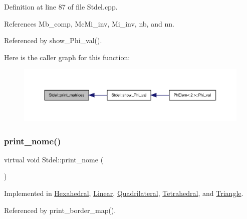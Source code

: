 Definition at line 87 of file Stdel.\+cpp.



References Mb\+\_\+comp, Mc\+Mi\+\_\+inv, Mi\+\_\+inv, nb, and nn.



Referenced by show\+\_\+\+Phi\+\_\+val().

Here is the caller graph for this function\+:
\nopagebreak
\begin{figure}[H]
\begin{center}
\leavevmode
\includegraphics[width=350pt]{classStdel_a319e6a16011b22e12028a841b7686f03_icgraph}
\end{center}
\end{figure}
\mbox{\label{classStdel_ac654f45f744ec4cfeab74ed4ded99ef5}} 
\subsubsection{\texorpdfstring{print\+\_\+nome()}{print\_nome()}}
{\footnotesize\ttfamily virtual void Stdel\+::print\+\_\+nome (\begin{DoxyParamCaption}\item[{F\+I\+LE $\ast$}]{ }\end{DoxyParamCaption})\hspace{0.3cm}{\ttfamily [pure virtual]}}



Implemented in \hyperlink{classHexahedral_a53c693b47166842fd72c51750c68297d}{Hexahedral}, \hyperlink{classLinear_a595913d994d6a49d3fe435252d56fceb}{Linear}, \hyperlink{classQuadrilateral_a3e28c85566a11cf7cd22d91d3b031826}{Quadrilateral}, \hyperlink{classTetrahedral_a8b37140c6823e724fc1eae1986ec69ff}{Tetrahedral}, and \hyperlink{classTriangle_a9943e9f4febaa9025ea324986726fdf6}{Triangle}.



Referenced by print\+\_\+border\+\_\+map().


